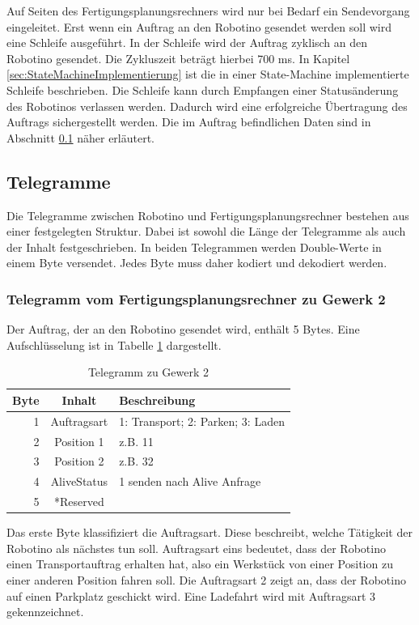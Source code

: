 Auf Seiten des Fertigungsplanungsrechners wird nur bei Bedarf ein Sendevorgang eingeleitet. Erst wenn ein Auftrag an den Robotino gesendet werden soll wird eine Schleife ausgeführt. In der Schleife wird der Auftrag zyklisch an den Robotino gesendet. Die Zykluszeit beträgt hierbei 700 ms. In Kapitel \ref{sec:StateMachineImplementierung} ist die in einer State-Machine implementierte Schleife beschrieben. Die Schleife kann durch Empfangen einer Statusänderung des Robotinos verlassen werden. Dadurch wird eine erfolgreiche Übertragung des Auftrags sichergestellt werden. Die im Auftrag befindlichen Daten sind in Abschnitt \ref{sec:Telegramme} näher erläutert.

\subsection{Telegramme}
\label{sec:Telegramme}

Die Telegramme zwischen Robotino und Fertigungsplanungsrechner bestehen aus einer festgelegten Struktur. Dabei ist sowohl die Länge der Telegramme als auch der Inhalt festgeschrieben. In beiden Telegrammen werden Double-Werte in einem Byte versendet. Jedes Byte muss daher kodiert und dekodiert werden. 

\subsubsection{Telegramm vom Fertigungsplanungsrechner zu Gewerk 2}

Der Auftrag, der an den Robotino gesendet wird, enthält 5 Bytes. Eine Aufschlüsselung ist in Tabelle \ref{tab:TelegrammZuG2} dargestellt. 

\begin{table}[!ht]
	\centering
	\begin{tabular}{|r|c|l|}
		\hline
		Byte & Inhalt	&	Beschreibung \\
		\hline
			1  & Auftragsart & 1: Transport; 2: Parken; 3: Laden  \\
			2  & Position 1  & z.B. 11 \\
			3  & Position 2  & z.B. 32 \\
		  4  & AliveStatus & 1 senden nach Alive Anfrage \\
		  5  & *Reserved   &  \\
		\hline
	\end{tabular}
	\caption{Telegramm zu Gewerk 2}
	\label{tab:TelegrammZuG2}
\end{table}

Das erste Byte klassifiziert die Auftragsart. Diese beschreibt, welche Tätigkeit der Robotino als nächstes tun soll. Auftragsart eins bedeutet, dass der Robotino einen Transportauftrag erhalten hat, also ein Werkstück von einer Position zu einer anderen Position fahren soll. Die Auftragsart 2 zeigt an, dass der Robotino auf einen Parkplatz geschickt wird. Eine Ladefahrt wird mit Auftragsart 3 gekennzeichnet. 

